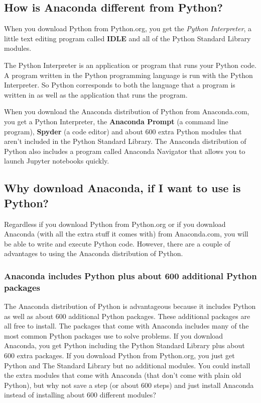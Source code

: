 \documentclass{book}
\begin{document}
    
        \subsection{How is Anaconda different from
Python?}\label{how-is-anaconda-different-from-python}

When you download Python from Python.org, you get the \emph{Python
Interpreter}, a little text editing program called \textbf{IDLE} and all
of the Python Standard Library modules.

The Python Interpreter is an application or program that runs your
Python code. A program written in the Python programming language is run
with the Python Interpreter. So Python corresponds to both the language
that a program is written in as well as the application that runs the
program.

When you download the Anaconda distribution of Python from Anaconda.com,
you get a Python Interpreter, the \textbf{Anaconda Prompt} (a command
line program), \textbf{Spyder} (a code editor) and about 600 extra
Python modules that aren't included in the Python Standard Library. The
Anaconda distribution of Python also includes a program called Anaconda
Navigator that allows you to launch Jupyter notebooks quickly.
    




    
        \subsection{Why download Anaconda, if I want to use is
Python?}\label{why-download-anaconda-if-i-want-to-use-is-python}

Regardless if you download Python from Python.org or if you download
Anaconda (with all the extra stuff it comes with) from Anaconda.com, you
will be able to write and execute Python code. However, there are a
couple of advantages to using the Anaconda distribution of Python.

\subsubsection{Anaconda includes Python plus about 600 additional Python
packages}\label{anaconda-includes-python-plus-about-600-additional-python-packages}

The Anaconda distribution of Python is advantageous because it includes
Python as well as about 600 additional Python packages. These additional
packages are all free to install. The packages that come with Anaconda
includes many of the most common Python packages use to solve problems.
If you download Anaconda, you get Python including the Python Standard
Library plus about 600 extra packages. If you download Python from
Python.org, you just get Python and The Standard Library but no
additional modules. You could install the extra modules that come with
Anaconda (that don't come with plain old Python), but why not save a
step (or about 600 steps) and just install Anaconda instead of
installing about 600 different modules?
\end{document}
